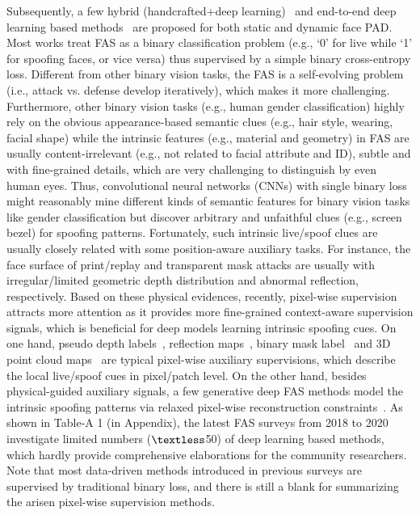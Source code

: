 \documentclass[10pt,journal,compsoc]{IEEEtran}
\begin{document}
\newcommand{\tabincell}[2]{\begin{tabular}{@{}#1@{}}#2\end{tabular}}


Subsequently, a few hybrid (handcrafted+deep learning)~\cite{song2019discriminative,asim2017cnn,rehman2020enhancing,khammari2019robust} and end-to-end deep learning based methods~\cite{yu2020searching,yu2020face,Liu2018Learning,yang2019face,Atoum2018Face,yu2020multi,zhang2020casia} are proposed for both static and dynamic face PAD. Most works\cite{yang2014learn,Li2017An,Patel2016Cross,george2019deep,jourabloo2018face,jia20203d,li2020compactnet} treat FAS as a binary classification problem (e.g., `0' for live while `1' for spoofing faces, or vice versa) thus supervised by a simple binary cross-entropy loss. Different from other binary vision tasks, the FAS is a self-evolving problem (i.e., attack vs. defense develop iteratively), which makes it more challenging. Furthermore, other binary vision tasks (e.g., human gender classification) highly rely on the obvious appearance-based semantic clues (e.g., hair style, wearing, facial shape) while the intrinsic features (e.g., material and geometry) in FAS are usually content-irrelevant (e.g., not related to facial attribute and ID), subtle and with fine-grained details, which are very challenging to distinguish by even human eyes. Thus, convolutional neural networks (CNNs) with single binary loss might reasonably mine different kinds of semantic features for binary vision tasks like gender classification but discover arbitrary and unfaithful clues (e.g., screen bezel) for spoofing patterns. Fortunately, such intrinsic live/spoof clues are usually closely related with some position-aware auxiliary tasks. For instance, the face surface of print/replay and transparent mask attacks are usually with irregular/limited geometric depth distribution and abnormal reflection, respectively. Based on these physical evidences, recently, pixel-wise supervision~\cite{Atoum2018Face,Liu2018Learning,yu2020face,kim2019basn,george2019deep,yu2020fas2} attracts more attention as it provides more fine-grained context-aware supervision signals, which is beneficial for deep models learning intrinsic spoofing cues. On one hand, pseudo depth labels~\cite{Atoum2018Face,Liu2018Learning}, reflection maps~\cite{yu2020face,kim2019basn}, binary mask label~\cite{george2019deep,liu2019deep,sun2020face} and 3D point cloud maps~\cite{li3dpc} are typical pixel-wise auxiliary supervisions, which describe the local live/spoof cues in pixel/patch level. On the other hand, besides physical-guided auxiliary signals, a few generative deep FAS methods model the intrinsic spoofing patterns via relaxed pixel-wise reconstruction constraints~\cite{jourabloo2018face,feng2020learning,liu2020physics,qin2021meta}. As shown in Table-A 1 (in Appendix), the latest FAS surveys from 2018 to 2020 investigate limited numbers ($\textless$50) of deep learning based methods, which hardly provide comprehensive elaborations for the community researchers. Note that most data-driven methods introduced in previous surveys are supervised by traditional binary loss, and there is still a blank for summarizing the arisen pixel-wise supervision methods. 
\end{document}
